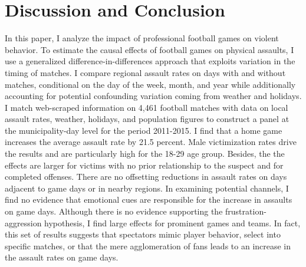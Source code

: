 \bigskip
\section{Discussion and Conclusion}\label{sec_soc_ext:conclusion}

In this paper, I analyze the impact of professional football games on violent behavior. To estimate the causal effects of football games on physical assaults, I use a generalized difference-in-differences approach that exploits variation in the timing of matches. I compare regional assault rates on days with and without matches, conditional on the day of the week, month, and year while additionally accounting for potential confounding variation coming from weather and holidays. I match web-scraped information on 4,461 football matches with data on local assault rates, weather, holidays, and population figures to construct a panel at the municipality-day level for the period 2011-2015. I find that a home game increases the average assault rate by 21.5 percent. Male victimization rates drive the results and are particularly high for the 18-29 age group. Besides, the the effects are larger for victims with no prior relationship to the suspect and for completed offenses. There are no offsetting reductions in assault rates on days adjacent to game days or in nearby regions. In examining potential channels, I find no evidence that emotional cues are responsible for the increase in assaults on game days. Although there is no evidence supporting the frustration-aggression hypothesis, I find large effects for prominent games and teams. In fact, this set of results suggests that spectators mimic player behavior, select into specific matches, or that the mere agglomeration of fans leads to an increase in the assault rates on game days. 




